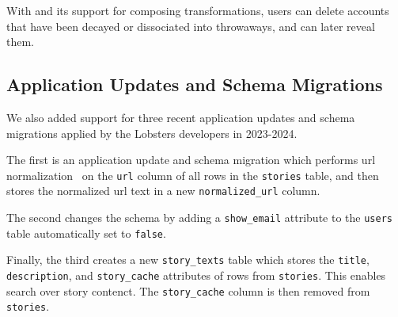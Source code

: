 %
With \sys and its support for composing \xxing transformations, users can
delete accounts that have been decayed or dissociated into throwaways, and
can later reveal them.

%

\subsection{Application Updates and Schema Migrations}
\label{s:casestudies:updates}
We also added support for three recent application updates and schema
migrations applied by the Lobsters developers in 2023-2024. 

The first is an application update and schema migration which performs url
normalization~\cite{urinorm} on the \texttt{url} column of all rows in the
\texttt{stories} table, and then stores the normalized url text in a new
\texttt{normalized\_url} column.
%

%
The second changes the schema by adding a \texttt{show\_email} attribute to the
\texttt{users} table automatically set to \texttt{false}. 

%
Finally, the third creates a new \texttt{story\_texts} table which stores the
\texttt{title}, \texttt{description}, and \texttt{story\_cache} attributes of
rows from \texttt{stories}. This enables search over story contenct. The
\texttt{story\_cache} column is then removed from \texttt{stories}.

